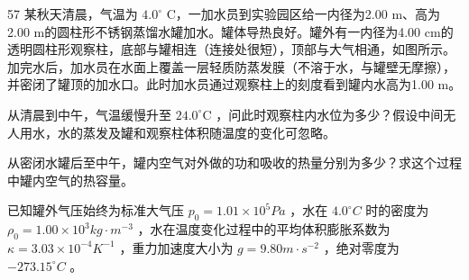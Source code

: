 \begin{problem}[33届物理竞赛复赛]{57}
    某秋天清晨，气温为 $4.0^{\circ}$ C，一加水员到实验园区给一内径为2.00 m、高为2.00 m的圆柱形不锈钢蒸馏水罐加水。罐体导热良好。罐外有一内径为4.00 cm的透明圆柱形观察柱，底部与罐相连（连接处很短），顶部与大气相通，如图所示。加完水后，加水员在水面上覆盖一层轻质防蒸发膜（不溶于水，与罐壁无摩擦），并密闭了罐顶的加水口。此时加水员通过观察柱上的刻度看到罐内水高为1.00 m。

    \begin{subproblem}
        从清晨到中午，气温缓慢升至 $24.0^{\circ} \mathrm{C}$ ，问此时观察柱内水位为多少？假设中间无人用水，水的蒸发及罐和观察柱体积随温度的变化可忽略。
    \end{subproblem}
    \begin{subproblem}
        从密闭水罐后至中午，罐内空气对外做的功和吸收的热量分别为多少？求这个过程中罐内空气的热容量。
    \end{subproblem}

    已知罐外气压始终为标准大气压 $p_{0}=1.01\times10^{5}Pa$ ，水在 $4.0^{\circ}C$ 时的密度为 $\rho_{0}=1.00\times10^{3}kg\cdot m^{-3}$ ，水在温度变化过程中的平均体积膨胀系数为 $\kappa=3.03\times10^{-4}K^{-1}$ ，重力加速度大小为 $g=9.80m\cdot s^{-2}$ ，绝对零度为 $-273.15^{\circ}C$ 。
\end{problem}